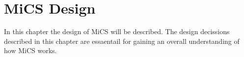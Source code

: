 \chapter{MiCS Design}

In this chapter the design of MiCS will be described. The design decissions described in this chapter are essaentail for gaining an overall understanding of how MiCS works.









